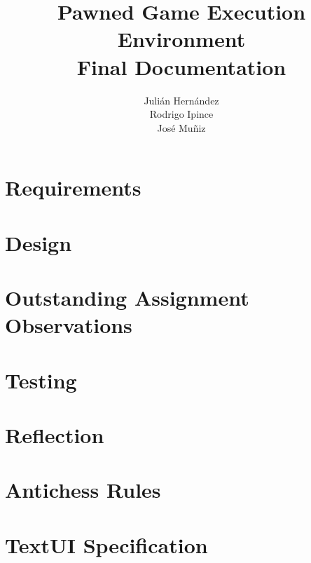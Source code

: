 \documentclass{report}
\author{Juli\'{a}n Hern\'{a}ndez\\
        Rodrigo Ipince\\
        Jos\'{e} Mu\~{n}iz}
\title{Pawned Game Execution Environment\\
       Final Documentation}
\begin{document}
	\maketitle
	\tableofcontents
	
	\chapter{Requirements}
		
		
	\chapter{Design}
		

	\chapter{Outstanding Assignment Observations}
		

	\chapter{Testing}
		

  \chapter{Reflection}
  	
  	
	\appendix
		 \chapter{Antichess Rules}\label{6170acrules}
			 

		 \chapter{TextUI Specification}\label{textuispec}
		 
	
	\printindex
		 
\end{document}

